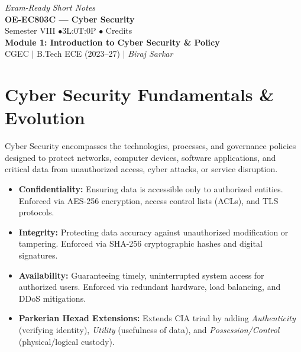 \documentclass[12pt,a4paper]{article}
\begin{document}
\begin{center}
  \hfill \textit{Exam-Ready Short Notes} \\
  \vspace{6pt}
  {\LARGE\bfseries\color{myred} OE-EC803C --- Cyber Security}\\[5pt]
  {\normalsize\color{mydark} Semester VIII \quad$\bullet$\quad 3L:0T:0P \quad$\bullet$ Credits}\\[3pt]
  {\normalsize\color{myteal}\textbf{Module 1: Introduction to Cyber Security \& Policy}}\\[3pt]
  {\small\color{mydark} CGEC \;$|$\; B.Tech ECE (2023--27) \;$|$\; \textit{Biraj Sarkar}}
\end{center}
\vspace{2pt}
\noindent{\color{myred}\rule{\linewidth}{1.5pt}}
\vspace{2pt}

\hypersetup{linkcolor=mydark}
\tableofcontents
\hypersetup{linkcolor=myteal}
\newpage

\section{Cyber Security Fundamentals \& Evolution}

Cyber Security encompasses the technologies, processes, and governance policies designed to protect networks, computer devices, software applications, and critical data from unauthorized access, cyber attacks, or service disruption.

\begin{tcolorbox}[defbox, title={\textbf{Definition: The CIA Triad \& Parkerian Hexad}}]
\begin{itemize}[leftmargin=*, itemsep=3pt]
  \item \textbf{Confidentiality:} Ensuring data is accessible only to authorized entities. Enforced via AES-256 encryption, access control lists (ACLs), and TLS protocols.
  \item \textbf{Integrity:} Protecting data accuracy against unauthorized modification or tampering. Enforced via SHA-256 cryptographic hashes and digital signatures.
  \item \textbf{Availability:} Guaranteeing timely, uninterrupted system access for authorized users. Enforced via redundant hardware, load balancing, and DDoS mitigations.
  \item \textbf{Parkerian Hexad Extensions:} Extends CIA triad by adding \textit{Authenticity} (verifying identity), \textit{Utility} (usefulness of data), and \textit{Possession/Control} (physical/logical custody).
\end{itemize}
\end{tcolorbox}
\end{document}

